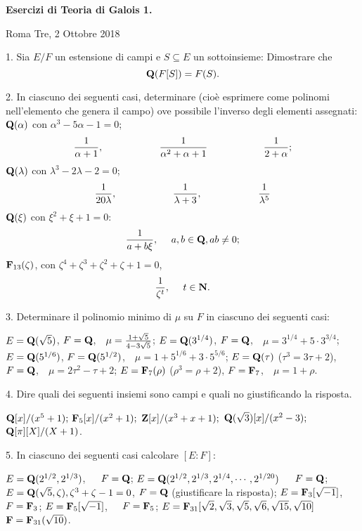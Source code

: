 \def\frac#1#2{{#1\over#2}}
\def\Q{{\bf Q}}
\def\Z{{\bf Z}}
\def\N{{\bf N}}
\def\F{{\bf F}}
\def\QQ{{\rm Q}}


\centerline{{\bf Esercizi di Teoria di Galois 1.}}\medskip

\centerline{Roma Tre, 2 Ottobre 2018}\bigskip

\item{1.} Sia $E/F$ un estensione di campi e $S\subseteq E$ un
sottoinsieme: Dimostrare che
$$\Q(F[S])=F(S).$$\bigskip

\item{2.} In ciascuno dei seguenti casi, determinare (cio\`{e} esprimere come polinomi
nell'elemento che genera il campo) ove possibile l'inverso
degli elementi assegnati:
 $\Q(\alpha)$ con $\alpha^3-5\alpha-1=0$;
$$\frac1{\alpha+1},\hskip 2cm\frac1{\alpha^2+\alpha+1}\hskip 2cm \frac1{2+\alpha};$$
 $\Q(\lambda)$ con $\lambda^3-2\lambda-2=0$;
$$\frac1{20\lambda},\hskip 2cm\frac1{\lambda+3},\hskip 2cm \frac 1{\lambda^5}$$
 $\Q(\xi)$ con $\xi^2+\xi+1=0$:
$$\frac1{a+b\xi},\ \ \ \ a,b\in\Q, ab\neq0;$$
 $\F_{13}(\zeta)$, con $\zeta^4+\zeta^3+\zeta^2+\zeta+1=0$,
$$\frac1{\zeta^t},\ \ \ \ t\in\N.$$
\bigskip


\item{3.} Determinare il polinomio minimo di $\mu$ su $F$ in ciascuno dei seguenti casi:

 $E=\Q(\sqrt{5})$, $F=\Q$,\ \hfill \ $\mu=\frac{1+\sqrt{5}}{4-3\sqrt{5}}$;\smallskip
{} $E=\Q(3^{1/4})$, $F=\Q$,\ \hfill \ $\mu=3^{1/4}+5\cdot3^{3/4}$;\smallskip
{} $E=\Q(5^{1/6})$, $F=\Q(5^{1/2})$,\ \hfill \ $\mu=1+5^{1/6}+3\cdot5^{5/6}$;\smallskip
{} $E=\Q(\tau)$ ($\tau^3=3\tau+2$), $F=\Q$,\ \hfill \ $\mu=2\tau^2-\tau+2$;\smallskip
{} $E=\F_{7}(\rho)$ ($\rho^3=\rho+2$), $F=\F_7$,\ \hfill \ $\mu=1+\rho$.
\bigskip

\item{4.} Dire quali dei seguenti insiemi sono campi e quali no giustificando la risposta.

 $\Q[x]/(x^5+1);$\smallskip
{} $\F_5[x]/(x^2+1);$\smallskip
{} $\Z[x]/(x^3+x+1);$\smallskip
{} $\Q(\sqrt{3})[x]/(x^2-3);$\smallskip
{} $\Q[\pi][X]/(X+1)$.
\bigskip

\item{5.} In ciascuno dei seguenti casi calcolare $[E:F]$:

 $E=\Q(2^{1/2},2^{1/3})$,\ \ \  $F=\Q$;\smallskip
{} $E=\Q(2^{1/2},2^{1/3},2^{1/4},\cdots,2^{1/20})$\ \ \  $F=\Q$;\smallskip
{} $E=\Q(\sqrt{5},\zeta), \zeta^3+\zeta-1=0$, $F=\Q$ (giustificare la risposta);\smallskip
{} $E=\F_3[\sqrt{-1}]$,\ \ \ $F=\F_3$;\smallskip
{} $E=\F_5[\sqrt{-1}]$,\ \ \ $F=\F_5$;\smallskip
{} $E=\F_{31}[\sqrt{2},\sqrt{3},\sqrt{5},\sqrt{6},\sqrt{15},\sqrt{10}]$\ \ \ $\F=\F_{31}(\sqrt{10})$.
\bigskip

